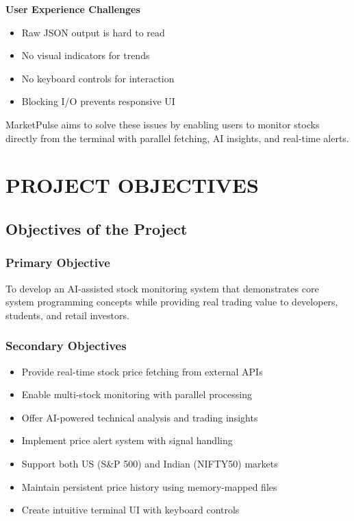 \documentclass[12pt,a4paper]{article}
\begin{document}
\textbf{User Experience Challenges}
\begin{itemize}[itemsep=0.3em]
    \item Raw JSON output is hard to read
    \item No visual indicators for trends
    \item No keyboard controls for interaction
    \item Blocking I/O prevents responsive UI
\end{itemize}

MarketPulse aims to solve these issues by enabling users to monitor stocks directly from the terminal with parallel fetching, AI insights, and real-time alerts.

\newpage

\section{PROJECT OBJECTIVES}

\subsection{Objectives of the Project}

\subsubsection{Primary Objective}
To develop an AI-assisted stock monitoring system that demonstrates core system programming concepts while providing real trading value to developers, students, and retail investors.

\subsubsection{Secondary Objectives}
\begin{itemize}[itemsep=0.3em]
    \item Provide real-time stock price fetching from external APIs
    \item Enable multi-stock monitoring with parallel processing
    \item Offer AI-powered technical analysis and trading insights
    \item Implement price alert system with signal handling
    \item Support both US (S\&P 500) and Indian (NIFTY50) markets
    \item Maintain persistent price history using memory-mapped files
    \item Create intuitive terminal UI with keyboard controls
\end{itemize}
\end{document}
